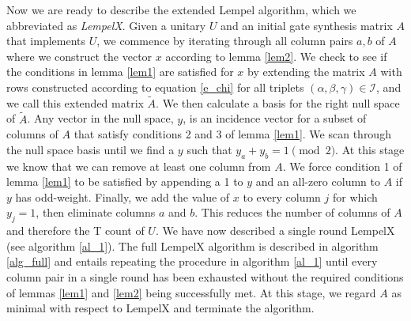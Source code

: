 \documentclass{article}
\theoremstyle{definition}
\theoremstyle{problem}
\theoremstyle{lemma}
\begin{document}
		Now we are ready to describe the extended Lempel algorithm, which we abbreviated as \emph{LempelX}. Given a unitary $U$ and an initial gate synthesis matrix $A$ that implements $U$, we commence by iterating through all column pairs $a,b$ of $A$ where we construct the vector $x$ according to lemma \ref{lem2}. We check to see if the conditions in lemma \ref{lem1} are satisfied for $x$ by extending the matrix $A$ with rows constructed according to equation \ref{e_chi} for all triplets $(\alpha,\beta,\gamma) \in \mathcal{I}$, and we call this extended matrix $\tilde{A}$. We then calculate a basis for the right null space of $\tilde{A}$. Any vector in the null space, $y$, is an incidence vector for a subset of columns of $A$ that satisfy conditions 2 and 3 of lemma \ref{lem1}. We scan through the null space basis until we find a $y$ such that $y_a + y_b = 1 \pmod{2}$. At this stage we know that we can remove at least one column from $A$. We force condition 1 of lemma \ref{lem1} to be satisfied by appending a 1 to $y$ and an all-zero column to $A$ if $y$ has odd-weight. Finally, we add the value of $x$ to every column $j$ for which $y_j = 1$, then eliminate columns $a$ and $b$. This reduces the number of columns of $A$ and therefore the T count of $U$. We have now described a single round LempelX (see algorithm \ref{al_1}). The full LempelX algorithm is described in algorithm \ref{alg_full} and entails repeating the procedure in algorithm \ref{al_1} until every column pair in a single round has been exhausted without the required conditions of lemmas \ref{lem1} and \ref{lem2} being successfully met. At this stage, we regard $A$ as minimal with respect to LempelX and terminate the algorithm.
		
\end{document}
